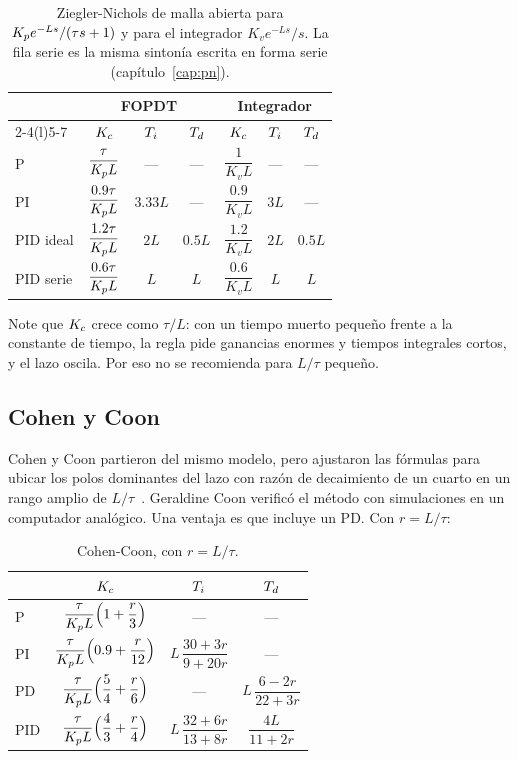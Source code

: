 \begin{table}[ht]
\centering
\caption{Ziegler-Nichols de malla abierta para $K_p e^{-Ls}/(\tau s+1)$ y para el integrador $K_v e^{-Ls}/s$. La fila serie es la misma sintonía escrita en forma serie (capítulo~\ref{cap:pn}).}
\label{tab:ps-zn-abierta}
\renewcommand{\arraystretch}{1.35}
\begin{tabular}{@{}lcccccc@{}}
\toprule
 & \multicolumn{3}{c}{FOPDT} & \multicolumn{3}{c}{Integrador}\\
\cmidrule(lr){2-4}\cmidrule(l){5-7}
 & $K_c$ & $T_i$ & $T_d$ & $K_c$ & $T_i$ & $T_d$\\
\midrule
P & $\dfrac{\tau}{K_p L}$ & --- & --- & $\dfrac{1}{K_vL}$ & --- & ---\\
PI & $\dfrac{0.9\tau}{K_p L}$ & $3.33L$ & --- & $\dfrac{0.9}{K_vL}$ & $3L$ & ---\\
PID ideal & $\dfrac{1.2\tau}{K_p L}$ & $2L$ & $0.5L$ & $\dfrac{1.2}{K_vL}$ & $2L$ & $0.5L$\\
PID serie & $\dfrac{0.6\tau}{K_p L}$ & $L$ & $L$ & $\dfrac{0.6}{K_vL}$ & $L$ & $L$\\
\bottomrule
\end{tabular}
\end{table}

Note que $K_c$ crece como $\tau/L$: con un tiempo muerto pequeño frente a la constante de tiempo, la regla pide ganancias enormes y tiempos integrales cortos, y el lazo oscila. Por eso no se recomienda para $L/\tau$ pequeño.

\subsection{Cohen y Coon}

Cohen y Coon partieron del mismo modelo, pero ajustaron las fórmulas para ubicar los polos dominantes del lazo con razón de decaimiento de un cuarto en un rango amplio de $L/\tau$~\citep{CoCo53}. Geraldine Coon verificó el método con simulaciones en un computador analógico. Una ventaja es que incluye un PD. Con $r=L/\tau$:

\begin{table}[ht]
\centering
\caption{Cohen-Coon, con $r=L/\tau$.}
\label{tab:ps-cc}
\renewcommand{\arraystretch}{1.5}
\begin{tabular}{@{}lccc@{}}
\toprule
 & $K_c$ & $T_i$ & $T_d$\\
\midrule
P & $\dfrac{\tau}{K_p L}\Bigl(1+\dfrac{r}{3}\Bigr)$ & --- & ---\\
PI & $\dfrac{\tau}{K_p L}\Bigl(0.9+\dfrac{r}{12}\Bigr)$ & $L\,\dfrac{30+3r}{9+20r}$ & ---\\
PD & $\dfrac{\tau}{K_p L}\Bigl(\dfrac54+\dfrac{r}{6}\Bigr)$ & --- & $L\,\dfrac{6-2r}{22+3r}$\\
PID & $\dfrac{\tau}{K_p L}\Bigl(\dfrac43+\dfrac{r}{4}\Bigr)$ & $L\,\dfrac{32+6r}{13+8r}$ & $\dfrac{4L}{11+2r}$\\
\bottomrule
\end{tabular}
\end{table}

